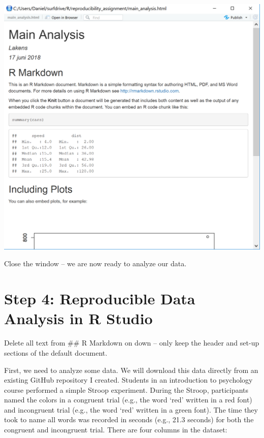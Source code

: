 \documentclass[
  oneside]{book}
\begin{document}
\begin{center}\includegraphics[width=1\linewidth]{images/9405a78d629bc5abd36ba8b31c42cfd9} \end{center}

Close the window -- we are now ready to analyze our data.

\hypertarget{step-4-reproducible-data-analysis-in-r-studio}{%
\section{Step 4: Reproducible Data Analysis in R Studio}\label{step-4-reproducible-data-analysis-in-r-studio}}

Delete all text from \#\# R Markdown on down -- only keep the header and set-up
sections of the default document.

First, we need to analyze some data. We will download this data directly from an
existing GitHub repository I created. Students in an introduction to psychology
course performed a simple Stroop experiment. During the Stroop, participants
named the colors in a congruent trial (e.g., the word `red' written in a red
font) and incongruent trial (e.g., the word `red' written in a green font). The
time they took to name all words was recorded in seconds (e.g., 21.3 seconds)
for both the congruent and incongruent trial. There are four columns in the
dataset:
\end{document}
